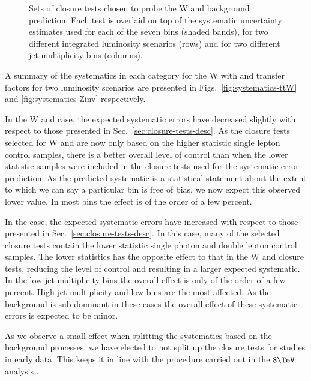\begin{figure}[h!]
\begin{center}
    \caption{Sets of closure tests chosen to probe the W and \ttbar
      background prediction. Each test is overlaid on top of
      the systematic uncertainty estimates used for each of the seven
      \scalht bins (shaded bands), for two different integrated
      luminosity scenarios (rows) and for two different jet
      multiplicity bins (columns).}
    \label{fig:ZinvClosure}
  \end{center} 
\end{figure}

A summary of the systematics in each category for the W with \ttbar 
and \znunu transfer factors for two luminosity scenarios are presented in
Figs.~\ref{fig:systematics-ttW} and \ref{fig:systematics-Zinv}
respectively. 

In the W and \ttbar case, the expected systematic errors have decreased 
slightly with respect to those presented in
Sec.~\ref{sec:closure-tests-desc}. As the
closure tests selected for W and \ttbar are now only based on the higher
statistic single lepton control samples, there is a better overall level of
control than when the lower statistic samples were included in the
closure tests used for the systematic error prediction. As the
predicted systematic is a statistical statement about the
extent to which we can say a particular bin is free of bias, we now 
expect this observed lower value. In most bins the
effect is of the order of a few percent.

In the \znunu case, the expected systematic errors have increased with
respect to those presented in Sec.~\ref{sec:closure-tests-desc}. In
this case, many of the selected closure tests contain the lower
statistic single photon and double lepton control samples. The lower
statistics has the opposite effect to that in the W and \ttbar closure 
tests, reducing the level of control and resulting in a larger
expected systematic. In the low jet multiplicity bins the overall
effect is only of the order of a few percent. High jet multiplicity
and low \scalht bins are the most affected. As the \znunu
background is sub-dominant in these cases the overall effect of these
systematic errors is expected to be minor.

As we observe a small effect when splitting the systematics based on
the background processes, we have elected to not split up the closure
tests for studies in early data. This keeps it in line with the
procedure carried out in the $8\tev$ analysis \cite{CMS_AN_2013-366}.


